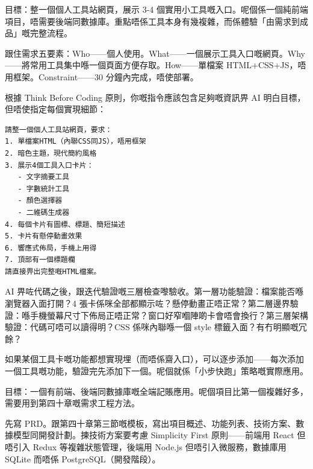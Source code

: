 



目標：整一個個人工具站網頁，展示 3-4 個實用小工具嘅入口。呢個係一個純前端項目，唔需要後端同數據庫。重點唔係工具本身有幾複雜，而係體驗「由需求到成品」嘅完整流程。

跟住需求五要素：Who——個人使用。What——一個展示工具入口嘅網頁。Why——將常用工具集中喺一個頁面方便存取。How——單檔案 HTML+CSS+JS，唔用框架。Constraint——30 分鐘內完成，唔使部署。


根據 Think Before Coding 原則，你嘅指令應該包含足夠嘅資訊畀 AI 明白目標，但唔使指定每個實現細節：

\begin{lstlisting}
請整一個個人工具站網頁，要求：
1. 單檔案HTML（內聯CSS同JS），唔用框架
2. 暗色主題，現代簡約風格
3. 展示4個工具入口卡片：
   - 文字摘要工具
   - 字數統計工具
   - 顏色選擇器
   - 二維碼生成器
4. 每個卡片有圖標、標題、簡短描述
5. 卡片有懸停動畫效果
6. 響應式佈局，手機上用得
7. 頂部有一個標題欄
請直接畀出完整嘅HTML檔案。
\end{lstlisting}


AI 畀咗代碼之後，跟迭代驗證嘅三層檢查嚟驗收。第一層功能驗證：檔案能否喺瀏覽器入面打開？4 張卡係咪全部都顯示咗？懸停動畫正唔正常？第二層邊界驗證：喺手機螢幕尺寸下佈局正唔正常？窗口好窄嗰陣啲卡會唔會換行？第三層架構驗證：代碼可唔可以讀得明？CSS 係咪內聯喺一個 style 標籤入面？有冇明顯嘅冗餘？

如果某個工具卡嘅功能都想實現埋（而唔係齋入口），可以逐步添加——每次添加一個工具嘅功能，驗證完先添加下一個。呢個就係「小步快跑」策略嘅實際應用。



目標：一個有前端、後端同數據庫嘅全端記賬應用。呢個項目比第一個複雜好多，需要用到第四十章嘅需求工程方法。

先寫 PRD。跟第四十章第三節嘅模板，寫出項目概述、功能列表、技術方案、數據模型同開發計劃。揀技術方案要考慮 Simplicity First 原則——前端用 React 但唔引入 Redux 等複雜狀態管理，後端用 Node.js 但唔引入微服務，數據庫用 SQLite 而唔係 PostgreSQL（開發階段）。

